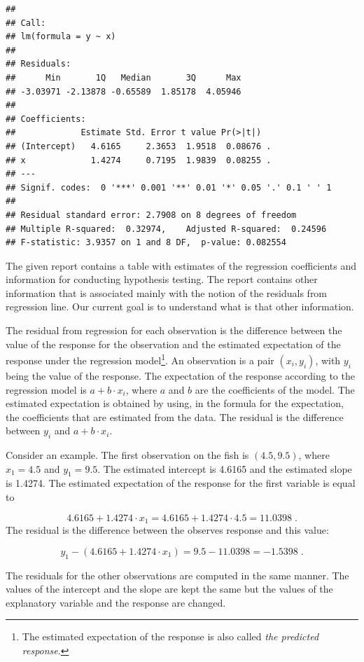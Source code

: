 \documentclass[]{krantz}
\theoremstyle{definition}
\theoremstyle{definition}
\theoremstyle{definition}
\theoremstyle{remark}
\begin{document}
\begin{verbatim}
## 
## Call:
## lm(formula = y ~ x)
## 
## Residuals:
##      Min       1Q   Median       3Q      Max 
## -3.03971 -2.13878 -0.65589  1.85178  4.05946 
## 
## Coefficients:
##             Estimate Std. Error t value Pr(>|t|)  
## (Intercept)   4.6165     2.3653  1.9518  0.08676 .
## x             1.4274     0.7195  1.9839  0.08255 .
## ---
## Signif. codes:  0 '***' 0.001 '**' 0.01 '*' 0.05 '.' 0.1 ' ' 1
## 
## Residual standard error: 2.7908 on 8 degrees of freedom
## Multiple R-squared:  0.32974,    Adjusted R-squared:  0.24596 
## F-statistic: 3.9357 on 1 and 8 DF,  p-value: 0.082554
\end{verbatim}

The given report contains a table with estimates of the regression
coefficients and information for conducting hypothesis testing. The
report contains other information that is associated mainly with the
notion of the residuals from regression line. Our current goal is to
understand what is that other information.

The residual from regression for each observation is the difference
between the value of the response for the observation and the estimated
expectation of the response under the regression model\footnote{The estimated expectation of the response is also called \emph{the
  predicted response}.}. An
observation is a pair \((x_i,y_i)\), with \(y_i\) being the value of the
response. The expectation of the response according to the regression
model is \(a + b \cdot x_i\), where \(a\) and \(b\) are the coefficients of
the model. The estimated expectation is obtained by using, in the
formula for the expectation, the coefficients that are estimated from
the data. The residual is the difference between \(y_i\) and
\(a + b \cdot x_i\).

Consider an example. The first observation on the fish is \((4.5, 9.5)\),
where \(x_1 = 4.5\) and \(y_1 = 9.5\). The estimated intercept is 4.6165 and
the estimated slope is 1.4274. The estimated expectation of the response
for the first variable is equal to

\[4.6165 + 1.4274 \cdot x_1 = 4.6165 + 1.4274 \cdot 4.5  =  11.0398\;.\]
The residual is the difference between the observes response and this
value:

\[y_1 - (4.6165 + 1.4274 \cdot x_1) = 9.5 - 11.0398 = -1.5398\;.\]

The residuals for the other observations are computed in the same
manner. The values of the intercept and the slope are kept the same but
the values of the explanatory variable and the response are changed.
\end{document}
